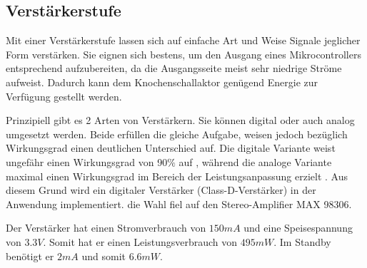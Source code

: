 \subsection{Verstärkerstufe} \label{sec:verstaerkerstufe}

Mit einer Verstärkerstufe lassen sich auf einfache Art und Weise Signale jeglicher Form verstärken. Sie eignen sich bestens, um den Ausgang eines Mikrocontrollers entsprechend aufzubereiten, da die Ausgangsseite meist sehr niedrige Ströme aufweist. Dadurch kann dem Knochenschallaktor genügend Energie zur Verfügung gestellt werden.

Prinzipiell gibt es 2 Arten von Verstärkern. Sie können digital oder auch analog umgesetzt werden. Beide erfüllen die gleiche Aufgabe, weisen jedoch bezüglich Wirkungsgrad einen deutlichen Unterschied auf. Die digitale Variante weist ungefähr einen Wirkungsgrad von 90$\%$ auf \cite{BoneConductorAdafruit}, während die analoge Variante maximal einen Wirkungsgrad im Bereich der Leistungsanpassung erzielt \cite{Niklaus_Skript}. Aus diesem Grund wird ein digitaler Verstärker (Class-D-Verstärker) in der Anwendung implementiert. die Wahl fiel auf den Stereo-Amplifier MAX 98306.

Der Verstärker hat einen Stromverbrauch von $150mA$ und eine Speisespannung von $3.3V$. Somit hat er einen Leistungsverbrauch von $495 mW$. Im Standby benötigt er $2 mA$ und somit $6.6 mW$.